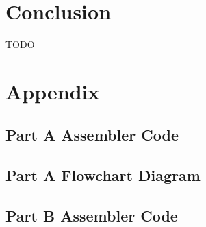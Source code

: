 \documentclass[letterpaper]{article}
\begin{document}
\section{Conclusion}
TODO
  \lipsum[9]
  \lipsum[10]

\newpage
\section{Appendix}
  \subsection{Part A Assembler Code}
    
\newpage
  \subsection{Part A Flowchart Diagram}
    \vspace{2cm}
    \noindent{}
\newpage
  \subsection{Part B Assembler Code}
    
\newpage
\end{document}
